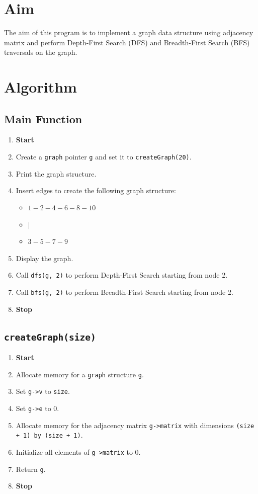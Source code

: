 
\section{Aim}
The aim of this program is to implement a graph data structure using adjacency matrix and perform Depth-First Search (DFS) and Breadth-First Search (BFS) traversals on the graph.

\section{Algorithm}
 {\selectfont
  \subsection{Main Function}
  \begin{enumerate}[label=\arabic*:,left=0pt]
    \item \textbf{Start}
    \item Create a \texttt{graph} pointer \texttt{g} and set it to \texttt{createGraph(20)}.
    \item Print the graph structure.
    \item Insert edges to create the following graph structure:
          \begin{itemize}
            \item \(1 - 2 - 4 - 6 - 8 - 10\)
            \item \(|\)
            \item \(3 - 5 - 7 - 9\)
          \end{itemize}
    \item Display the graph.
    \item Call \texttt{dfs(g, 2)} to perform Depth-First Search starting from node 2.
    \item Call \texttt{bfs(g, 2)} to perform Breadth-First Search starting from node 2.
    \item \textbf{Stop}
  \end{enumerate}

  \subsection{\texttt{createGraph(size)}}
  \begin{enumerate}[label=\arabic*:,left=0pt]
    \item \textbf{Start}
    \item Allocate memory for a \texttt{graph} structure \texttt{g}.
    \item Set \texttt{g->v} to \texttt{size}.
    \item Set \texttt{g->e} to 0.
    \item Allocate memory for the adjacency matrix \texttt{g->matrix} with dimensions \texttt{(size + 1) by (size + 1)}.
    \item Initialize all elements of \texttt{g->matrix} to 0.
    \item Return \texttt{g}.
    \item \textbf{Stop}
  \end{enumerate}

}
